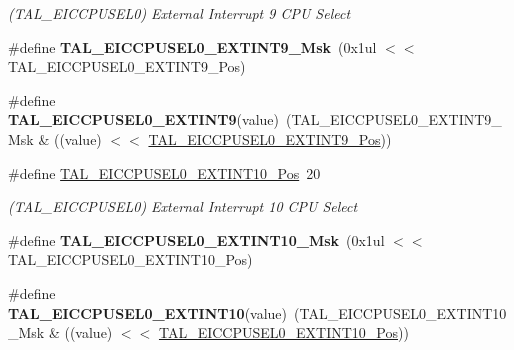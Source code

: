 \begin{DoxyCompactItemize}
\begin{DoxyCompactList}\small\item\em (T\+A\+L\+\_\+\+E\+I\+C\+C\+P\+U\+S\+E\+L0) External Interrupt 9 C\+P\+U Select \end{DoxyCompactList}\item 
\hypertarget{group___s_a_m_l21___t_a_l_ga0815290fbf76de839e99132658b44366}{}\#define {\bfseries T\+A\+L\+\_\+\+E\+I\+C\+C\+P\+U\+S\+E\+L0\+\_\+\+E\+X\+T\+I\+N\+T9\+\_\+\+Msk}~(0x1ul $<$$<$ T\+A\+L\+\_\+\+E\+I\+C\+C\+P\+U\+S\+E\+L0\+\_\+\+E\+X\+T\+I\+N\+T9\+\_\+\+Pos)\label{group___s_a_m_l21___t_a_l_ga0815290fbf76de839e99132658b44366}

\item 
\hypertarget{group___s_a_m_l21___t_a_l_gad1ad004bfe515b65b9fbeab525cb2260}{}\#define {\bfseries T\+A\+L\+\_\+\+E\+I\+C\+C\+P\+U\+S\+E\+L0\+\_\+\+E\+X\+T\+I\+N\+T9}(value)~(T\+A\+L\+\_\+\+E\+I\+C\+C\+P\+U\+S\+E\+L0\+\_\+\+E\+X\+T\+I\+N\+T9\+\_\+\+Msk \& ((value) $<$$<$ \hyperlink{group___s_a_m_l21___t_a_l_ga8175f7e92ab4db1d9d18337d2c7877d4}{T\+A\+L\+\_\+\+E\+I\+C\+C\+P\+U\+S\+E\+L0\+\_\+\+E\+X\+T\+I\+N\+T9\+\_\+\+Pos}))\label{group___s_a_m_l21___t_a_l_gad1ad004bfe515b65b9fbeab525cb2260}

\item 
\hypertarget{group___s_a_m_l21___t_a_l_ga70cfcce3d11774c0ab11012f2d999b3b}{}\#define \hyperlink{group___s_a_m_l21___t_a_l_ga70cfcce3d11774c0ab11012f2d999b3b}{T\+A\+L\+\_\+\+E\+I\+C\+C\+P\+U\+S\+E\+L0\+\_\+\+E\+X\+T\+I\+N\+T10\+\_\+\+Pos}~20\label{group___s_a_m_l21___t_a_l_ga70cfcce3d11774c0ab11012f2d999b3b}

\begin{DoxyCompactList}\small\item\em (T\+A\+L\+\_\+\+E\+I\+C\+C\+P\+U\+S\+E\+L0) External Interrupt 10 C\+P\+U Select \end{DoxyCompactList}\item 
\hypertarget{group___s_a_m_l21___t_a_l_ga2dad07bcab4a1fec458543e1e645ae2f}{}\#define {\bfseries T\+A\+L\+\_\+\+E\+I\+C\+C\+P\+U\+S\+E\+L0\+\_\+\+E\+X\+T\+I\+N\+T10\+\_\+\+Msk}~(0x1ul $<$$<$ T\+A\+L\+\_\+\+E\+I\+C\+C\+P\+U\+S\+E\+L0\+\_\+\+E\+X\+T\+I\+N\+T10\+\_\+\+Pos)\label{group___s_a_m_l21___t_a_l_ga2dad07bcab4a1fec458543e1e645ae2f}

\item 
\hypertarget{group___s_a_m_l21___t_a_l_gaa410493bc27e600c06ea40a42cddac7f}{}\#define {\bfseries T\+A\+L\+\_\+\+E\+I\+C\+C\+P\+U\+S\+E\+L0\+\_\+\+E\+X\+T\+I\+N\+T10}(value)~(T\+A\+L\+\_\+\+E\+I\+C\+C\+P\+U\+S\+E\+L0\+\_\+\+E\+X\+T\+I\+N\+T10\+\_\+\+Msk \& ((value) $<$$<$ \hyperlink{group___s_a_m_l21___t_a_l_ga70cfcce3d11774c0ab11012f2d999b3b}{T\+A\+L\+\_\+\+E\+I\+C\+C\+P\+U\+S\+E\+L0\+\_\+\+E\+X\+T\+I\+N\+T10\+\_\+\+Pos}))\label{group___s_a_m_l21___t_a_l_gaa410493bc27e600c06ea40a42cddac7f}


\end{DoxyCompactItemize}
